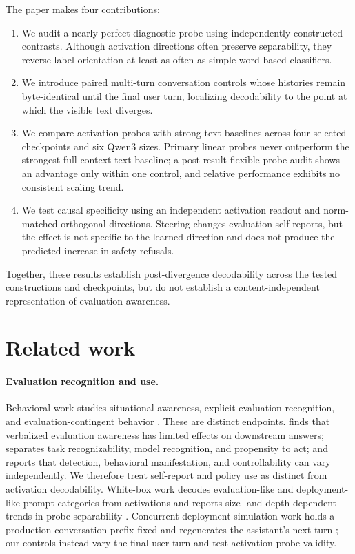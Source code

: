 \documentclass{article}
\begin{document}
The paper makes four contributions:
\begin{enumerate}
  \item We audit a nearly perfect diagnostic probe using independently
  constructed contrasts. Although activation directions often preserve
  separability, they reverse label orientation at least as often as simple
  word-based classifiers.
  \item We introduce paired multi-turn conversation controls whose histories
  remain byte-identical until the final user turn, localizing decodability to
  the point at which the visible text diverges.
  \item We compare activation probes with strong text baselines across four
  selected checkpoints and six Qwen3 sizes. Primary linear probes never
  outperform the strongest full-context text baseline; a post-result
  flexible-probe audit shows an advantage only within one control, and relative
  performance exhibits no consistent scaling trend.
  \item We test causal specificity using an independent activation readout and
  norm-matched orthogonal directions. Steering changes evaluation self-reports,
  but the effect is not specific to the learned direction and does not produce
  the predicted increase in safety refusals.
\end{enumerate}
Together, these results establish
post-divergence decodability across the tested constructions and checkpoints,
but do not establish a content-independent representation of evaluation
awareness.

\section{Related work}

\paragraph{Evaluation recognition and use.}
Behavioral work studies situational awareness, explicit evaluation recognition,
and evaluation-contingent behavior
\citep{laine2024sad,needham2025know,greenblatt2024alignment}. These are distinct
endpoints. \citet{knecht2026limited} finds that verbalized evaluation awareness
has limited effects on downstream answers; \citet{li2026decomposing} separates
task recognizability, model recognition, and propensity to act; and
\citet{nayan2026notone} reports that detection, behavioral manifestation, and
controllability can vary independently. We therefore treat self-report and
policy use as distinct from activation decodability. White-box work decodes
evaluation-like and deployment-like prompt categories from activations \citep{nguyen2025probing}
and reports size- and depth-dependent trends in probe separability
\citep{chaudhary2025scaling,manek2026depth}. Concurrent deployment-simulation
work holds a production conversation prefix fixed and regenerates the
assistant's next turn \citep{williams2026simulating}; our controls instead vary
the final user turn and test activation-probe validity.
\end{document}
